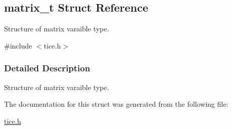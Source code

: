 \hypertarget{structmatrix__t}{}\subsection{matrix\+\_\+t Struct Reference}
\label{structmatrix__t}


Structure of matrix varaible type.  




{\ttfamily \#include $<$tice.\+h$>$}



\subsubsection{Detailed Description}
Structure of matrix varaible type. 

The documentation for this struct was generated from the following file\+:\begin{DoxyCompactItemize}
\item 
\hyperlink{tice_8h}{tice.\+h}\end{DoxyCompactItemize}
